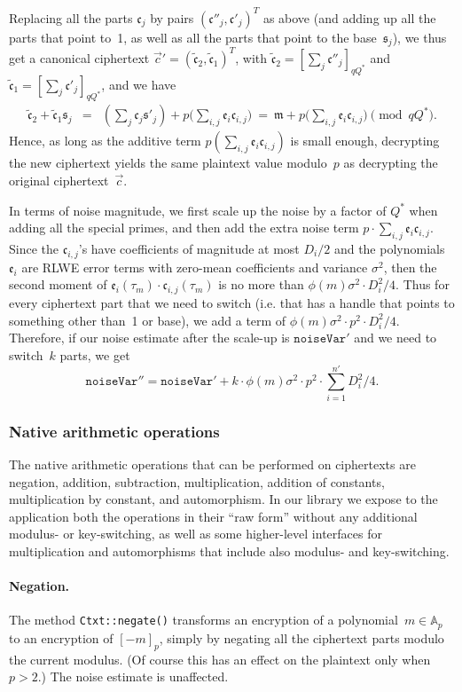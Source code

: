 \documentclass[14pt]{extarticle}
\newcommand{\A}{\mathbb{A}}
\def\vc{\vec{c}}
\newcommand{\ee}{\mathfrak{e}}
\newcommand{\ct}{\mathfrak{c}}
\newcommand{\mm}{\mathfrak{m}}
\newcommand{\sk}{\mathfrak{s}}
\begin{document}
Replacing all the parts $\ct_j$ by pairs $(\ct''_j,\ct'_j)^T$ as
above (and adding up all the parts that point to~1, as well as all
the parts that point to the base~$\sk_j$), we thus get a canonical
ciphertext $\vc'=(\tilde{\ct}_2,\tilde{\ct}_1)^T$, with 
$\tilde{\ct}_2=[\sum_j \ct''_j]_{qQ^*}$ and $\tilde{\ct}_1=[\sum_j
\ct'_j]_{qQ^*}$, and we have
\begin{eqnarray*}
\tilde{\ct}_2+\tilde{\ct}_1\sk_j 
&=& \left(\sum_j\ct_j \sk'_j\right) + p\big(\sum_{i,j} \ee_i\ct_{i,j}\big)
~=~ \mm + p\big(\sum_{i,j} \ee_i\ct_{i,j}\big) \pmod{qQ^*}.
\end{eqnarray*}
Hence, as long as the additive term $p(\sum_{i,j} \ee_i\ct_{i,j})$ is
small enough, decrypting the new ciphertext yields the same plaintext
value modulo~$p$ as decrypting the original ciphertext~$\vc$.

In terms of noise magnitude, we first scale up the noise by a factor
of $Q^*$ when adding all the special primes, and then add the extra
noise term $p\cdot\sum_{i,j} \ee_i\ct_{i,j}$. Since the $\ct_{i,j}$'s
have coefficients of magnitude at most $D_i/2$ and the polynomials
$\ee_i$ are RLWE error terms with zero-mean coefficients and variance
$\sigma^2$, then the second moment of $\ee_i(\tau_m)
\cdot\ct_{i,j}(\tau_m)$ is no more than $\phi(m)\sigma^2\cdot D_i^2/4$.
Thus for every ciphertext part that we need to switch (i.e. that has a
handle that points to something other than~1 or base), we add a term
of $\phi(m)\sigma^2\cdot p^2\cdot D_i^2/4$. Therefore, if our noise
estimate after the scale-up is $\mathtt{noiseVar}'$ and we need to
switch~$k$ parts, we get
\[
\mathtt{noiseVar}'' = \mathtt{noiseVar}' + k\cdot\phi(m)\sigma^2
\cdot p^2\cdot \sum_{i=1}^{n'} D_i^2/4.
\]

\subsubsection{Native arithmetic operations} \label{sec:nativeArith}
The native arithmetic operations that can be performed on ciphertexts
are negation, addition, subtraction, multiplication, addition of
constants, multiplication by constant, and automorphism. In our library
we expose to the application both the operations in their ``raw form''
without any additional modulus- or key-switching, as well as some
higher-level interfaces for multiplication and automorphisms that
include also modulus- and key-switching.

\paragraph{Negation.} The method \texttt{Ctxt::negate()} transforms
an encryption of a polynomial~$m\in\A_p$ to an encryption of
$[-m]_p$, simply by negating all the ciphertext parts modulo the
current modulus. (Of course this has an effect on the plaintext only
when $p>2$.) The noise estimate is unaffected.
\end{document}
